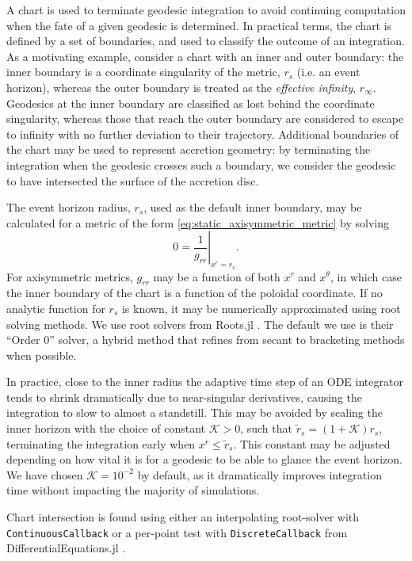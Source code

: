 A chart is used to terminate geodesic integration to avoid continuing computation when the fate of a given geodesic is determined. In practical terms, the chart is defined by a set of boundaries, and used to classify the outcome of an integration. As a motivating example, consider a chart with an inner and outer boundary: the inner boundary is a coordinate singularity of the metric, $r_s$ (i.e. an event horizon), whereas the outer boundary is treated as the \textit{effective infinity}, $r_\infty$. Geodesics at the inner boundary are classified as lost behind the coordinate singularity, whereas those that reach the outer boundary are considered to escape to infinity with no further deviation to their trajectory. Additional boundaries of the chart may be used to represent accretion geometry: by terminating the integration when the geodesic crosses such a boundary, we consider the geodesic to have intersected the surface of the accretion disc. 

The event horizon radius, $r_s$, used as the default inner boundary, may be calculated for a metric of the form \eqref{eq:static_axisymmetric_metric} by solving
\begin{equation}
    \label{eq:event_horizon}
    0 = \left. \frac{1}{g_{rr}} \right\rvert_{x^r = r_s}.
\end{equation}
For axisymmetric metrics, $g_{rr}$ may be a function of both $x^r$ and $x^\theta$, in which case the inner boundary of the chart is a function of the poloidal coordinate. If no analytic function for $r_s$ is known, it may be numerically approximated using root solving methods. We use root solvers from Roots.jl \citep{}. The default we use is their ``Order 0'' solver, a hybrid method that refines from secant to bracketing methods when possible.

In practice, close to the inner radius the adaptive time step of an ODE integrator tends to shrink dramatically due to near-singular derivatives, causing the integration to slow to almost a standstill. This may be avoided by scaling the inner horizon with the choice of constant $\mathcal{K} > 0$, such that $\tilde{r}_s = (1 + \mathcal{K}) r_s$, terminating the integration early when $x^r \leq \tilde{r}_s$. This constant may be adjusted depending on how vital it is for a geodesic to be able to glance the event horizon. We have chosen $\mathcal{K} = 10^{-2}$ by default, as it dramatically improves integration time without impacting the majority of simulations. 

Chart intersection is found using either an interpolating root-solver with \texttt{ContinuousCallback} or a per-point test with \texttt{DiscreteCallback} from DifferentialEquations.jl \citep{}.


